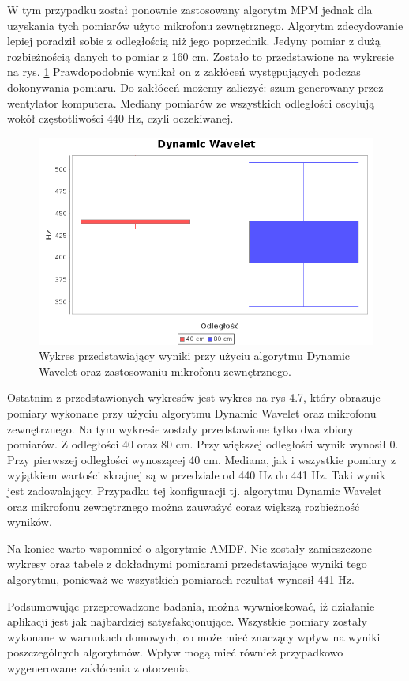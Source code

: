 W tym przypadku został ponownie zastosowany algorytm MPM jednak dla uzyskania tych pomiarów użyto mikrofonu zewnętrznego. Algorytm zdecydowanie lepiej poradził sobie z odległością niż jego poprzednik. Jedyny pomiar z dużą rozbieżnością danych to pomiar z 160 cm. Zostało to przedstawione na wykresie na rys. \ref{dynamiz} Prawdopodobnie wynikał on z zakłóceń występujących podczas dokonywania pomiaru. Do zakłóceń możemy zaliczyć: szum generowany przez wentylator komputera. Mediany pomiarów ze wszystkich odległości oscylują wokół częstotliwości 440 Hz, czyli oczekiwanej.



\begin{figure}[h!]
  \centering
  \includegraphics[width=0.9\linewidth]{rys/BoxPlots/Dynamic_mic_zew}
  \caption{Wykres przedstawiający wyniki przy użyciu algorytmu Dynamic Wavelet oraz zastosowaniu mikrofonu zewnętrznego.}
  \label{dynamiz}
\end{figure}

Ostatnim z przedstawionych wykresów jest wykres na rys 4.7, który obrazuje pomiary wykonane przy użyciu algorytmu Dynamic Wavelet oraz mikrofonu zewnętrznego. Na tym wykresie zostały przedstawione tylko dwa zbiory pomiarów. Z odległości 40 oraz 80 cm. Przy większej odległości wynik wynosił 0. Przy pierwszej odległości wynoszącej 40 cm. Mediana, jak i wszystkie pomiary z wyjątkiem wartości skrajnej są w przedziale od 440 Hz do 441 Hz. Taki wynik jest zadowalający. Przypadku tej konfiguracji tj. algorytmu Dynamic Wavelet oraz mikrofonu zewnętrznego można zauważyć coraz większą rozbieżność wyników.


Na koniec warto wspomnieć o algorytmie AMDF. Nie zostały zamieszczone wykresy oraz tabele z dokładnymi pomiarami przedstawiające wyniki tego algorytmu, ponieważ we wszystkich pomiarach rezultat wynosił 441 Hz.

Podsumowując przeprowadzone badania, można wywnioskować, iż działanie aplikacji jest jak najbardziej satysfakcjonujące. Wszystkie pomiary zostały wykonane w warunkach domowych, co może mieć znaczący wpływ na wyniki poszczególnych algorytmów. Wpływ mogą mieć również przypadkowo wygenerowane zakłócenia z otoczenia.
